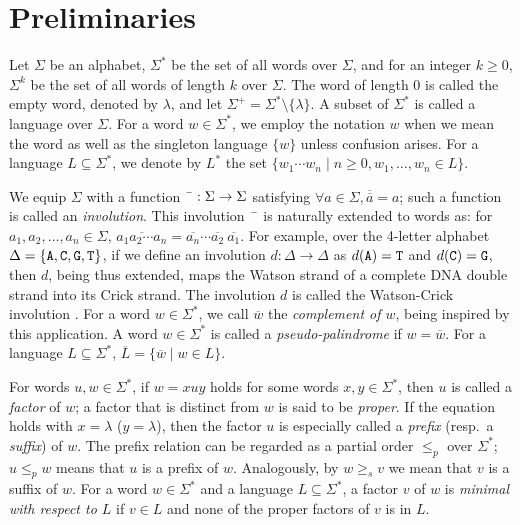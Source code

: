 \documentclass{article}
\theoremstyle{plain}
\theoremstyle{remark}
\begin{document}
\section{Preliminaries}

Let $\Sigma$ be an alphabet, $\Sigma^*$ be the set of all words over $\Sigma$, and for an integer $k \ge 0$, $\Sigma^k$ be the set of all words of length $k$ over $\Sigma$. 
The word of length 0 is called the empty word, denoted by $\lambda$, and let $\Sigma^+ = \Sigma^* \setminus \{\lambda\}$. 
A subset of $\Sigma^*$ is called a language over $\Sigma$. 
For a word $w \in \Sigma^*$, we employ the notation $w$ when we mean the word as well as the singleton language $\{w\}$ unless confusion arises. 
For a language $L \subseteq \Sigma^*$, we denote by $L^*$ the set $\{w_1 \cdots w_n \mid n \ge 0, w_1, \ldots, w_n \in L\}$. 

We equip $\Sigma$ with a function $\bar{\hspace{2mm}}: \Sigma \to \Sigma$ satisfying $\forall a \in \Sigma, \overline{\overline{a}} = a$; such a function is called an {\it involution}. 
This involution $\bar{\hspace*{2mm}}$ is naturally extended to words as: for $a_1, a_2, \ldots, a_n \in \Sigma$, $\overline{a_1 a_2 \cdots a_n} = \overline{a_n} \cdots \overline{a_2} \ \overline{a_1}$. 
For example, over the 4-letter alphabet $\Delta = \{{\tt A, C, G, T}\}$, if we define an involution $d: \Delta \to \Delta$ as $d({\tt A}) = {\tt T}$ and $d({\tt C}) = {\tt G}$, then $d$, being thus extended, maps the Watson strand of a complete DNA double strand into its Crick strand. 
The involution $d$ is called the Watson-Crick involution \cite{KariMahalingam08}. 
For a word $w \in \Sigma^*$, we call $\overline{w}$ the {\it complement of $w$}, being inspired by this application. 
A word $w \in \Sigma^*$ is called a {\it pseudo-palindrome} if $w = \overline{w}$. 
For a language $L \subseteq \Sigma^*$, $\overline{L} = \{\overline{w} \mid w \in L\}$. 

For words $u, w \in \Sigma^*$, if $w = xuy$ holds for some words $x, y \in \Sigma^*$, then $u$ is called a {\it factor} of $w$; a factor that is distinct from $w$ is said to be {\it proper}. 
If the equation holds with $x = \lambda$ ($y = \lambda$), then the factor $u$ is especially called a {\it prefix} (resp.~a {\it suffix}) of $w$. 
The prefix relation can be regarded as a partial order $\le_p$ over $\Sigma^*$; $u \le_p w$ means that $u$ is a prefix of $w$. 
Analogously, by $w \ge_s v$ we mean that $v$ is a suffix of $w$. 
For a word $w \in \Sigma^*$ and a language $L \subseteq \Sigma^*$, a factor $v$ of $w$ is {\it minimal with respect to $L$} if $v \in L$ and none of the proper factors of $v$ is in $L$. 
\end{document}
